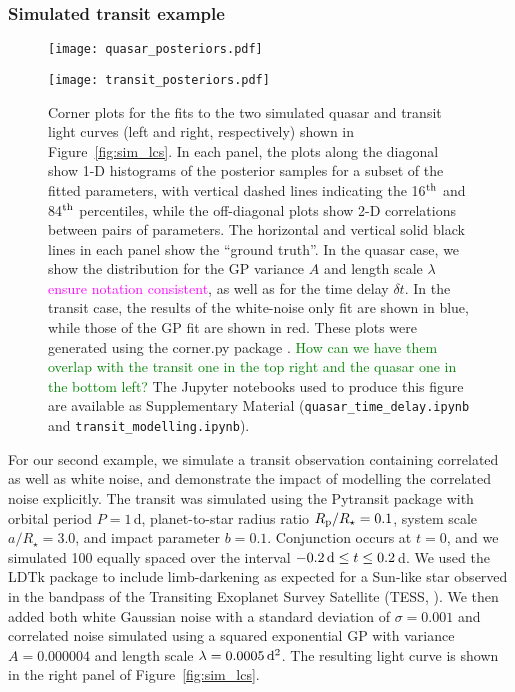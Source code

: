 \documentclass[letterpaper]{ar-1col}
\newcommand{\suz}[1]{\textcolor{magenta}{#1}}
\newcommand{\dan}[1]{\textcolor{green}{#1}}
\begin{document}
\subsubsection{Simulated transit example}
\label{sec:sim_transit}

\begin{figure}[h]
  \centering
  \begin{minipage}[t]{0.48\linewidth}
    \texttt{[image: quasar\_posteriors.pdf]} 
  \end{minipage} \hfill
  \begin{minipage}[t]{0.48\linewidth}
    \texttt{[image: transit\_posteriors.pdf]}
  \end{minipage}
  \caption{Corner plots for the fits to the two simulated quasar and transit light curves (left and right, respectively) shown in Figure~\ref{fig:sim_lcs}.  
  In each panel, the plots along the diagonal show 1-D histograms of the posterior samples for a subset of the fitted parameters, with vertical dashed lines indicating the 16$^{\rm th}$ and 84$^{\rm th}$ percentiles, while the off-diagonal plots show 2-D correlations between pairs of parameters. The horizontal and vertical solid black lines in each panel show the ``ground truth''. In the quasar case, we show the distribution for the GP variance $A$ and length scale $\lambda$ \suz{ensure notation consistent}, as well as for the time delay $\delta t$. In the transit case, the results of the white-noise only fit are shown in blue, while those of the GP fit are shown in red. These plots were generated using the {\sc corner.py} package \citep{corner}. \dan{How can we have them overlap with the transit one in the top right and the quasar one in the bottom left?} The {\sc Jupyter} notebooks used to produce this figure are available as Supplementary Material (\texttt{quasar\_time\_delay.ipynb} and \texttt{transit\_modelling.ipynb}).}
  \label{fig:sim_posteriors}
\end{figure}
  
For our second example, we simulate a transit observation containing correlated as well as white noise, and demonstrate the impact of modelling the correlated noise explicitly. The transit was simulated using the {\sc Pytransit} package \citep{2015MNRAS.450.3233P} with orbital period $P=1$\,d, planet-to-star radius ratio $R_{\rm p}/R_\star=0.1$, system scale $a/R_\star=3.0$, and impact parameter $b=0.1$. Conjunction occurs at $t=0$, and we simulated 100 equally spaced over the interval $-0.2\,{\rm d} \le t \le 0.2$\,d. We used the {\sc LDTk} package \citep{2015MNRAS.453.3821P} to include limb-darkening as expected for a Sun-like star observed in the bandpass of the Transiting Exoplanet Survey Satellite (TESS, \citealt{2015JATIS...1a4003R}). We then added both white Gaussian noise with a standard deviation of $\sigma=0.001$ and correlated noise simulated using a squared exponential GP with variance $A=0.000004$ and length scale $\lambda=0.0005\,{\rm d}^2$. The resulting light curve is shown in the right panel of Figure~\ref{fig:sim_lcs}.
\end{document}
